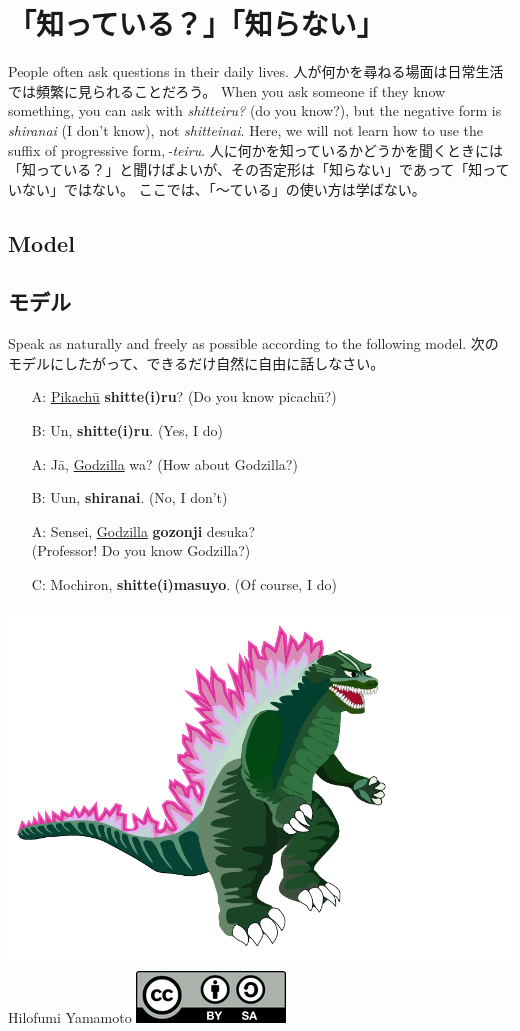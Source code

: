 \documentclass[uplatex,dvipdfmx,b5paper,english,10pt]{jsbook}
\begin{document}
\section{「知っている？」「知らない」}
\fi

\ifEnglish
People often ask questions in their daily lives.
\else
人が何かを尋ねる場面は日常生活では頻繁に見られることだろう。
\fi
\ifEnglish
When you ask someone if they know something, you can ask with {\it shitteiru?\/} (do you know?), but the negative form is {\it shiranai\/} (I don't know), not {\it shitteinai\/}.
Here, we will not learn how to use the suffix of progressive form,\,{\it -teiru\/}.
\else
人に何かを知っているかどうかを聞くときには「知っている？」と聞けばよいが、その否定形は「知らない」であって「知っていない」ではない。
ここでは、「～ている」の使い方は学ばない。
\fi
\ifEnglish
\subsection{Model}
\else
\subsection{モデル}
\fi

\begin{toiquestion}
\ifEnglish
Speak as naturally and freely as possible according to the following model.
\else
次のモデルにしたがって、できるだけ自然に自由に話しなさい。
\fi
\end{toiquestion}

\begin{itemize}
  \item[A:] \underline{Pikach\=u} {\bfseries shitte(i)ru}? (Do you know picach\=u?)
 \item[B:] Un, {\bfseries shitte(i)ru}. (Yes, I do)
 \item[A:] J\=a, \underline{Godzilla} wa? (How about Godzilla?)
 \item[B:] Uun, {\bfseries shiranai}. (No, I don't)
 \item[A:] Sensei, \underline{Godzilla} {\bfseries gozonji} desuka?\\(Professor! Do you know Godzilla?)
 \item[C:] Mochiron, {\bfseries shitte(i)masuyo}. (Of course, I do)
\end{itemize}

\begin{center}
\includegraphics[trim=5 17 100 10,clip,width=.20\hsize]{img/godzilla02.pdf}
\\\vspace*{0.2\baselineskip}
{\tiny Hilofumi Yamamoto}
\includegraphics[width=.08\hsize]{img/by-sa.png}
\vspace*{0\baselineskip}
\end{center}
\end{document}
